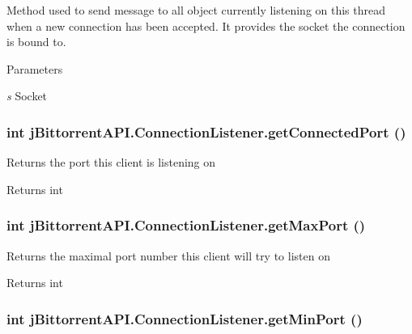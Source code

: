\label{classj_bittorrent_a_p_i_1_1_connection_listener_aca6fadfba821799d0c47ca04fee3e963}
Method used to send message to all object currently listening on this thread when a new connection has been accepted. It provides the socket the connection is bound to.


\begin{DoxyParams}{Parameters}
\item[{\em s}]Socket \end{DoxyParams}
\hypertarget{classj_bittorrent_a_p_i_1_1_connection_listener_ac20a333270dedd9da96f17b7c51b712a}{
\subsubsection[{getConnectedPort}]{\setlength{\rightskip}{0pt plus 5cm}int jBittorrentAPI.ConnectionListener.getConnectedPort ()}}
\label{classj_bittorrent_a_p_i_1_1_connection_listener_ac20a333270dedd9da96f17b7c51b712a}
Returns the port this client is listening on \begin{DoxyReturn}{Returns}
int 
\end{DoxyReturn}
\hypertarget{classj_bittorrent_a_p_i_1_1_connection_listener_a2955a07eb43d334e278b01215b93b830}{
\subsubsection[{getMaxPort}]{\setlength{\rightskip}{0pt plus 5cm}int jBittorrentAPI.ConnectionListener.getMaxPort ()}}
\label{classj_bittorrent_a_p_i_1_1_connection_listener_a2955a07eb43d334e278b01215b93b830}
Returns the maximal port number this client will try to listen on \begin{DoxyReturn}{Returns}
int 
\end{DoxyReturn}
\hypertarget{classj_bittorrent_a_p_i_1_1_connection_listener_abbc53be91686fc734c3614599dc05b61}{
\subsubsection[{getMinPort}]{\setlength{\rightskip}{0pt plus 5cm}int jBittorrentAPI.ConnectionListener.getMinPort ()}}
